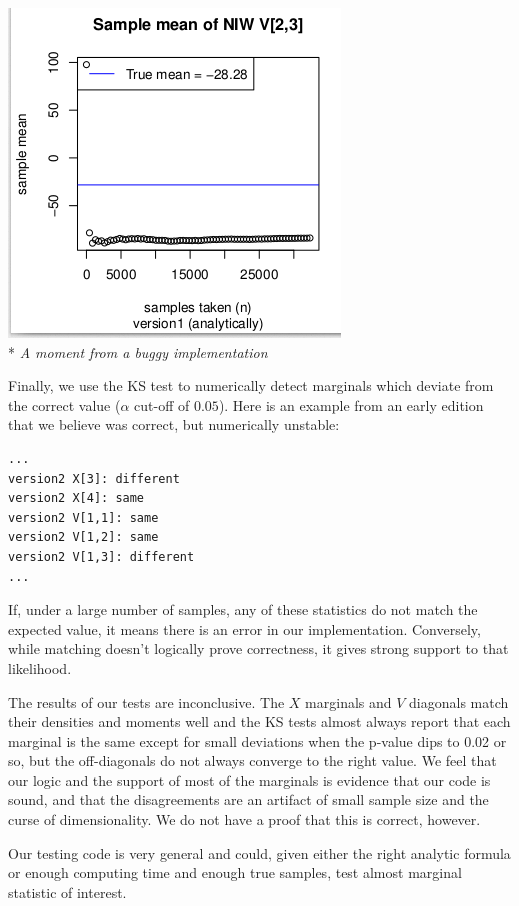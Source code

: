 \documentclass[english]{report}
\begin{document}
\begin{center}
\includegraphics[scale=.8]{momentincorrect.png}\\*
\emph{A moment from a buggy implementation}
\\  
\end{center}


Finally, we use the KS test to numerically detect marginals which deviate from the correct value ($\alpha$ cut-off of $0.05$). Here is an example from an early edition that we believe was correct, but numerically unstable:
\begin{verbatim}
...
version2 X[3]: different
version2 X[4]: same
version2 V[1,1]: same
version2 V[1,2]: same
version2 V[1,3]: different
...
\end{verbatim}


If, under a large number of samples, any of these statistics do not match the expected value, it means there is an error in our implementation. Conversely, while matching doesn't logically prove correctness, it gives strong support to that likelihood.

The results of our tests are inconclusive. The $X$ marginals and $V$ diagonals match their densities and moments well and the KS tests almost always report that each marginal is the same except for small deviations when the p-value dips to 0.02 or so, but the off-diagonals do not always converge to the right value. We feel that our logic and the support of most of the marginals is evidence that our code is sound, and that the disagreements are an artifact of small sample size and the curse of dimensionality. We do not have a proof that this is correct, however.

Our testing code is very general and could, given either the right analytic formula or enough computing time and enough true samples, test almost marginal statistic of interest.
\end{document}
